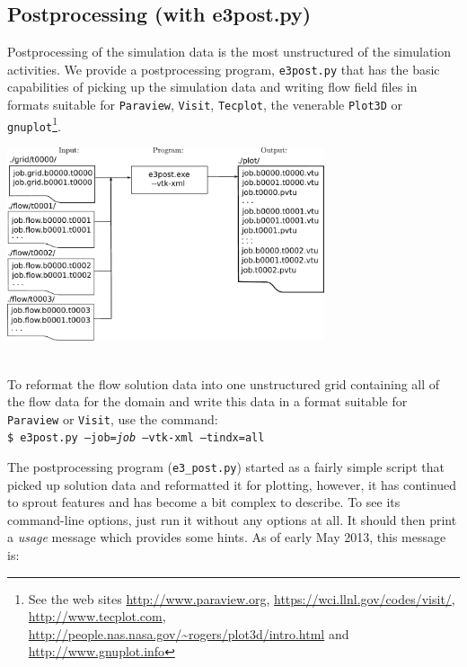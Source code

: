 \subsection{Postprocessing (with e3post.py)} 
\label{sec:e3post}
%
Postprocessing of the simulation data is the most unstructured of the simulation activities.
We provide a postprocessing program, \texttt{e3post.py} that has the basic capabilities of picking up 
the simulation data and writing flow field files in formats suitable for 
\texttt{Paraview}, \texttt{Visit}, \texttt{Tecplot}, the venerable \texttt{Plot3D} or 
\texttt{gnuplot}\footnote{See the web sites  \url{http://www.paraview.org}, \url{https://wci.llnl.gov/codes/visit/},
\url{http://www.tecplot.com}, \url{http://people.nas.nasa.gov/\~rogers/plot3d/intro.html} and \url{http://www.gnuplot.info}}.
\vspace{0.25cm} \\
\centerline{\includegraphics[width=0.7\textwidth]{figs/post-process.pdf}}\\

\medskip
To reformat the flow solution data into one unstructured grid
containing all of the flow data for the domain and write this data in a format suitable
for \texttt{Paraview} or \texttt{Visit}, use the command:\\
\texttt{\$ e3post.py --job=\textit{job} --vtk-xml --tindx=all}\\ 

\medskip
The postprocessing program (\texttt{e3\_post.py}) started as a fairly simple script that picked up solution data
and reformatted it for plotting, however, it has continued to sprout features and has become a bit 
complex to describe.
To see its command-line options, just run it without any options at all.
It should then print a \textit{usage} message which provides some hints.
As of early May 2013, this message is:

